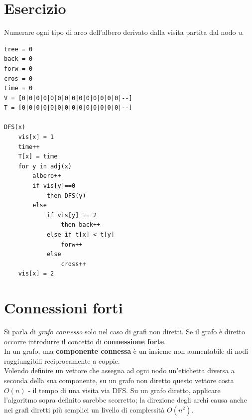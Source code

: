 \section{Esercizio}
Numerare ogni tipo di arco dell'albero derivato dalla visita partita dal nodo \textit{u}.\\

\begin{lstlisting}
tree = 0
back = 0
forw = 0
cros = 0
time = 0
V = [0|0|0|0|0|0|0|0|0|0|0|0|0|0|--]
T = [0|0|0|0|0|0|0|0|0|0|0|0|0|0|--]

DFS(x)
	vis[x] = 1 
	time++
	T[x] = time
	for y in adj(x)
		albero++
		if vis[y]==0
			then DFS(y)
		else
			if vis[y] == 2
				then back++
			else if t[x] < t[y]
				forw++
			else
				cross++
	vis[x] = 2
\end{lstlisting}

\section{Connessioni forti}
Si parla di \textit{grafo connesso} solo nel caso di grafi non diretti. Se il grafo è diretto occorre introdurre il concetto di \textbf{connessione forte}.\\
In un grafo, una \textbf{componente connessa} è un insieme non aumentabile di nodi raggiungibili reciprocamente a coppie.\\
Volendo definire un vettore che assegna ad ogni nodo un'etichetta diversa a seconda della sua componente, su un grafo non diretto questo vettore costa $ O(n) $ - il tempo di una visita via DFS.
Su un grafo diretto, applicare l'algoritmo sopra definito sarebbe scorretto; la direzione degli archi causa anche nei grafi diretti più semplici un livello di complessità $ O(n^2) $.